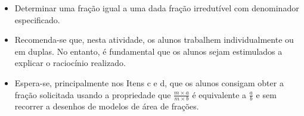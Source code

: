 \begin{multicols}{2}
\begin{solucao}{}{}
\begin{enumerate}[a)]
\begin{center}

\end{center}
\end{enumerate}
\end{solucao}
\Bg

\begin{objetivos}[label=chap4-ativ9]{}{}
\begin{itemize} %
    \item       Determinar uma fração igual a uma dada fração irredutível com
denominador especificado.
\end{itemize} %
\end{objetivos}

  
\begin{orientacoes}{}{}

\begin{itemize} %
    \item       Recomenda-se que, nesta atividade, os alunos trabalhem
individualmente ou em duplas. No entanto, é fundamental que os alunos sejam
estimulados a explicar o raciocínio realizado.
    \item       Espera-se, principalmente nos Itens c e d, que os alunos
consigam obter a fração solicitada usando a propriedade que       $\frac{m
\times a}{m \times b}$       é equivalente a       $\frac{a}{b}$       e sem
recorrer a desenhos de modelos de área de frações.
\end{itemize} %




\end{orientacoes}
\end{multicols}
